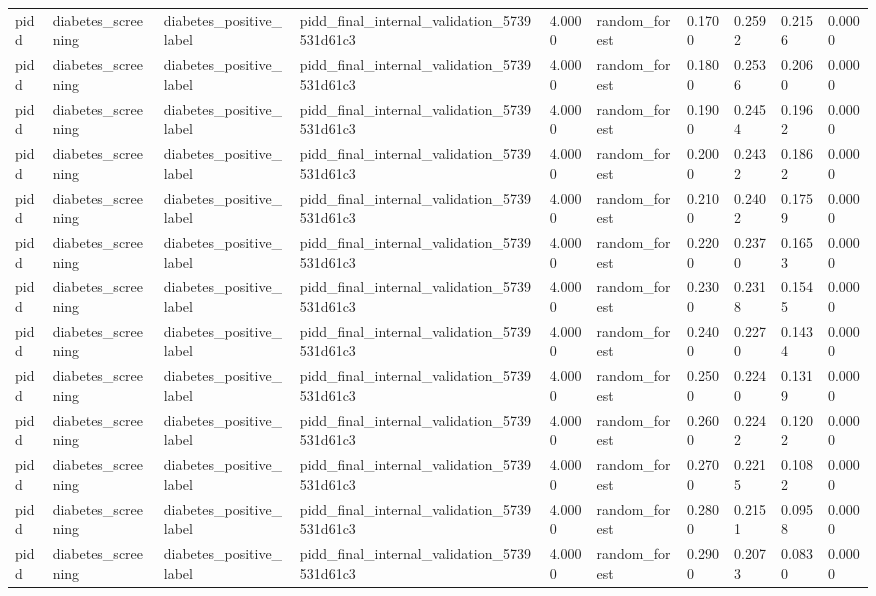 \begin{tabular}{llllllllll}
pidd & diabetes\_screening & diabetes\_positive\_label & pidd\_final\_internal\_validation\_5739531d61c3 & 4.0000 & random\_forest & 0.1700 & 0.2592 & 0.2156 & 0.0000 \\
pidd & diabetes\_screening & diabetes\_positive\_label & pidd\_final\_internal\_validation\_5739531d61c3 & 4.0000 & random\_forest & 0.1800 & 0.2536 & 0.2060 & 0.0000 \\
pidd & diabetes\_screening & diabetes\_positive\_label & pidd\_final\_internal\_validation\_5739531d61c3 & 4.0000 & random\_forest & 0.1900 & 0.2454 & 0.1962 & 0.0000 \\
pidd & diabetes\_screening & diabetes\_positive\_label & pidd\_final\_internal\_validation\_5739531d61c3 & 4.0000 & random\_forest & 0.2000 & 0.2432 & 0.1862 & 0.0000 \\
pidd & diabetes\_screening & diabetes\_positive\_label & pidd\_final\_internal\_validation\_5739531d61c3 & 4.0000 & random\_forest & 0.2100 & 0.2402 & 0.1759 & 0.0000 \\
pidd & diabetes\_screening & diabetes\_positive\_label & pidd\_final\_internal\_validation\_5739531d61c3 & 4.0000 & random\_forest & 0.2200 & 0.2370 & 0.1653 & 0.0000 \\
pidd & diabetes\_screening & diabetes\_positive\_label & pidd\_final\_internal\_validation\_5739531d61c3 & 4.0000 & random\_forest & 0.2300 & 0.2318 & 0.1545 & 0.0000 \\
pidd & diabetes\_screening & diabetes\_positive\_label & pidd\_final\_internal\_validation\_5739531d61c3 & 4.0000 & random\_forest & 0.2400 & 0.2270 & 0.1434 & 0.0000 \\
pidd & diabetes\_screening & diabetes\_positive\_label & pidd\_final\_internal\_validation\_5739531d61c3 & 4.0000 & random\_forest & 0.2500 & 0.2240 & 0.1319 & 0.0000 \\
pidd & diabetes\_screening & diabetes\_positive\_label & pidd\_final\_internal\_validation\_5739531d61c3 & 4.0000 & random\_forest & 0.2600 & 0.2242 & 0.1202 & 0.0000 \\
pidd & diabetes\_screening & diabetes\_positive\_label & pidd\_final\_internal\_validation\_5739531d61c3 & 4.0000 & random\_forest & 0.2700 & 0.2215 & 0.1082 & 0.0000 \\
pidd & diabetes\_screening & diabetes\_positive\_label & pidd\_final\_internal\_validation\_5739531d61c3 & 4.0000 & random\_forest & 0.2800 & 0.2151 & 0.0958 & 0.0000 \\
pidd & diabetes\_screening & diabetes\_positive\_label & pidd\_final\_internal\_validation\_5739531d61c3 & 4.0000 & random\_forest & 0.2900 & 0.2073 & 0.0830 & 0.0000 \\

\end{tabular}
